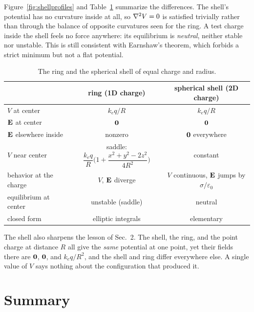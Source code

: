 \documentclass[11pt,a4paper]{article}
\newcommand{\ke}{k_e}
\begin{document}
Figure~\ref{fig:shellprofiles} and Table~\ref{tab:compare} summarize the differences. The shell's potential has no curvature inside at all, so $\laplacian V=0$ is satisfied trivially rather than through the balance of opposite curvatures seen for the ring. A test charge inside the shell feels no force anywhere: its equilibrium is \emph{neutral}, neither stable nor unstable. This is still consistent with Earnshaw's theorem, which forbids a strict minimum but not a flat potential.

\begin{table}[h]
\centering
\renewcommand{\arraystretch}{1.45}
\begin{tabular}{lcc}
\hline
 & ring (1D charge) & spherical shell (2D charge) \\
\hline
$V$ at center & $\ke q/R$ & $\ke q/R$ \\
$\vb E$ at center & $\vb 0$ & $\vb 0$ \\
$\vb E$ elsewhere inside & nonzero & $\vb 0$ everywhere \\
$V$ near center & saddle: $\dfrac{\ke q}{R}\Big(1+\dfrac{x^2+y^2-2z^2}{4R^2}\Big)$ & constant \\
behavior at the charge & $V$, $\vb E$ diverge & $V$ continuous, $\vb E$ jumps by $\sigma/\varepsilon_0$ \\
equilibrium at center & unstable (saddle) & neutral \\
closed form & elliptic integrals & elementary \\
\hline
\end{tabular}
\caption{The ring and the spherical shell of equal charge and radius.}
\label{tab:compare}
\end{table}

The shell also sharpens the lesson of Sec.~2. The shell, the ring, and the point charge at distance $R$ all give the \emph{same} potential at one point, yet their fields there are $\vb 0$, $\vb 0$, and $\ke q/R^2$, and the shell and ring differ everywhere else. A single value of $V$ says nothing about the configuration that produced it.

\section{Summary}
\end{document}
